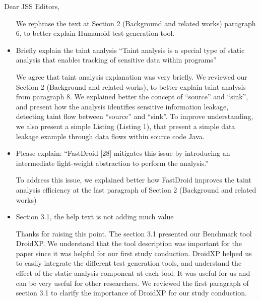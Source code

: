 \documentclass[12pt,english]{scrartcl}
\begin{document}
\begin{letter}{Dear JSS Editors,}
\begin{itemize}
\vspace{0.2cm}

{\color{blue}{\bf Answer.} We rephrase the text at Section 2 (Background and related works) paragraph 6, to better explain Humanoid test generation tool.}

\vspace{0.2cm}

\item Briefly explain the taint analysis
``Taint analysis is a special type of static analysis that enables tracking of sensitive data within programs''


\vspace{0.2cm}

{\color{blue}{\bf Answer.} We agree that taint analysis explanation was very briefly. We reviewed our Section 2 (Background and related works), to better explain taint analysis from paragraph 8. We explained better the concept of ``source'' and ``sink'', and present how the analysis identifies sensitive information leakage, detecting taint flow between “source” and “sink”. To improve understanding, we also present a simple Listing (Listing 1), that present a simple data leakage example through data flows within source code Java. }


\vspace{0.2cm}

\item Please explain:
``FastDroid [28] mitigates this issue by introducing an intermediate light-weight abstraction to perform the analysis.''


\vspace{0.2cm}

{\color{blue}{\bf Answer.} To address this issue, we explained better how FastDroid improves the taint analysis efficiency at the last paragraph of Section 2 (Background and related works)}

\vspace{0.2cm}

\item Section 3.1, the help text is not adding much value

\vspace{0.2cm}

{\color{blue}{\bf Answer.} Thanks for raising this point. The section 3.1 presented our Benchmark tool DroidXP. We understand that the tool description was important for the paper since it was helpful for our first study conduction. DroidXP helped us to easily integrate the different test generation tools, and understand the effect of the static analysis component at each tool. It was useful for us and can be very useful for other researchers. We
reviewed the first paragraph of section 3.1 to clarify the importance of DroidXP for our study conduction.}



\end{itemize}
\end{letter}
\end{document}
